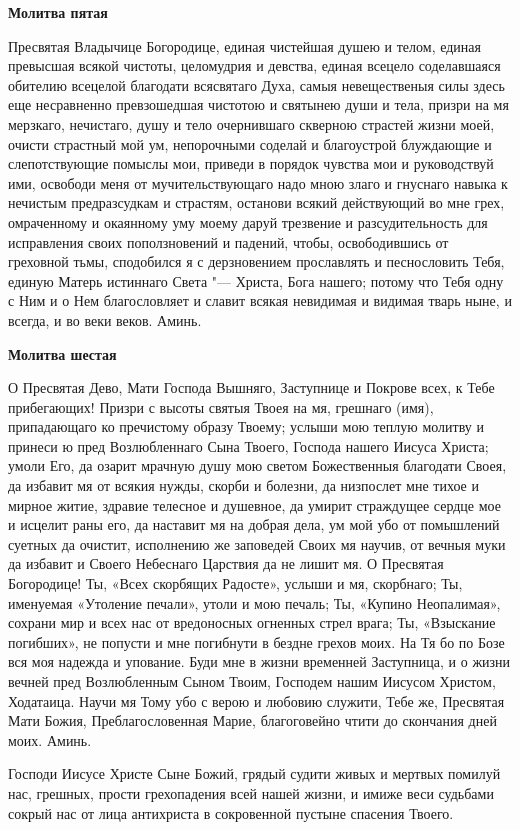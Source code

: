 \medskip


\bfseries Молитва пятая\normalfont{}\nopagebreak


Пресвятая Владычице Богородице, единая чистейшая душею и телом, единая превысшая всякой чистоты, целомудрия и девства, единая всецело соделавшаяся обителию всецелой благодати всясвятаго Духа, самыя невещественыя силы здесь еще несравненно превзошедшая чистотою и святынею души и тела, призри на мя мерзкаго, нечистаго, душу и тело очернившаго скверною страстей жизни моей, очисти страстный мой ум, непорочными соделай и благоустрой блуждающие и слепотствующие помыслы мои, приведи в порядок чувства мои и руководствуй ими, освободи меня от мучительствующаго надо мною злаго и гнуснаго навыка к нечистым предразсудкам и страстям, останови всякий действующий во мне грех, омраченному и окаянному уму моему даруй трезвение и разсудительность для исправления своих поползновений и падений, чтобы, освободившись от греховной тьмы, сподобился я с дерзновением прославлять и песнословить Тебя, единую Матерь истиннаго Света "--- Христа, Бога нашего; потому что Тебя одну с Ним и о Нем благословляет и славит всякая невидимая и видимая тварь ныне, и всегда, и во веки веков. Аминь.


\medskip


\bfseries Молитва шестая\normalfont{}\nopagebreak


О Пресвятая Дево, Мати Господа Вышняго, Заступнице и Покрове всех, к Тебе прибегающих! Призри с высоты святыя Твоея на мя, грешнаго (имя), припадающаго ко пречистому образу Твоему; услыши мою теплую молитву и принеси ю пред Возлюбленнаго Сына Твоего, Господа нашего Иисуса Христа; умоли Его, да озарит мрачную душу мою светом Божественныя благодати Своея, да избавит мя от всякия нужды, скорби и болезни, да низпослет мне тихое и мирное житие, здравие телесное и душевное, да умирит страждущее сердце мое и исцелит раны его, да наставит мя на добрая дела, ум мой убо от помышлений суетных да очистит, исполнению же заповедей Своих мя научив, от вечныя муки да избавит и Своего Небеснаго Царствия да не лишит мя. О Пресвятая Богородице! Ты, «Всех скорбящих Радосте», услыши и мя, скорбнаго; Ты, именуемая «Утоление печали», утоли и мою печаль; Ты, «Купино Неопалимая», сохрани мир и всех нас от вредоносных огненных стрел врага; Ты, «Взыскание погибших», не попусти и мне погибнути в бездне грехов моих. На Тя бо по Бозе вся моя надежда и упование. Буди мне в жизни временней Заступница, и о жизни вечней пред Возлюбленным Сыном Твоим, Господем нашим Иисусом Христом, Ходатаица. Научи мя Тому убо с верою и любовию служити, Тебе же, Пресвятая Мати Божия, Преблагословенная Марие, благоговейно чтити до скончания дней моих. Аминь.


\bigskip\mychapterending

 


Господи Иисусе Христе Сыне Божий, грядый судити живых и мертвых помилуй нас, грешных, прости грехопадения всей нашей жизни, и имиже веси судьбами сокрый нас от лица антихриста в сокровенной пустыне спасения Твоего.
\nopagebreak\bigskip\bigskip\mychapterending
